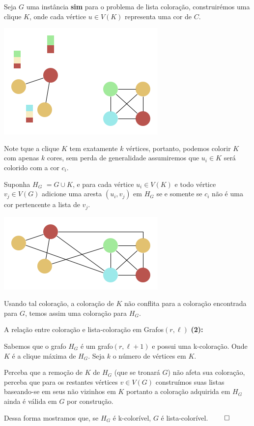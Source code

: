 \documentclass[9pt, compress]{beamer}
\begin{document}
    \begin{frame}
      Seja $G$ uma instância \textbf{sim} para o problema de lista coloração, construirémos uma clique $K$, onde cada vértice $u \in V(K)$ representa uma cor de $C$.
      \begin{center}
        \includegraphics[scale=0.4]{../figuras/presentation-K.png}
      \end{center}
      Note tque a clique $K$ tem exatamente $k$ vértices, portanto, podemos colorir $K$ com apenas $k$ cores, sem perda de generalidade assumiremos que $u_i \in K$ será colorido com a cor $c_i$.
    \end{frame}
    \begin{frame}  
      Suponha $H_G$ $= G \cup K$, e para cada vértice $u_i \in V(K)$ e todo vértice $v_j \in V(G)$ adicione uma aresta $(u_i,v_j) $ em $H_G$ se e somente se $c_i$ não é uma cor pertencente a lista de $v_j$.
      \begin{center}
        \includegraphics[scale=0.4]{../figuras/presentation-H.png}
      \end{center}   
      Usando tal coloração, a coloração de $K$ não conflita para a coloração encontrada para $G$, temos assim uma coloração para $H_G$. 
    \end{frame}
    \begin{frame}{A relação entre coloração e lista-coloração em Grafos$(r,\ell)$}
      \textbf{(2):}
      
      Sabemos que o grafo $H_G$ é um grafo$(r,\ell+1)$ e possui uma k-coloração. Onde $K$ é a clique máxima de $H_G$.
      Seja $k$ o número de vértices em $K$.
      
      Perceba que a remoção de $K$ de $H_G$ (que se tronará $G$) não afeta sua coloração, perceba que para os restantes vértices $v \in V(G)$ construímos suas listas baseando-se em seus não vizinhos em $K$ portanto a coloração adquirida em $H_G$ ainda é válida em $G$ por construção.
      
      Dessa forma mostramos que, se $H_G$ é k-colorível, $G$ é lista-colorível.
      $\qed$
    \end{frame}
\end{document}
